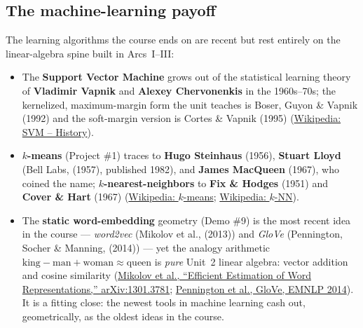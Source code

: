 \documentclass[11pt]{article}
\newcommand{\who}[1]{{\sffamily\bfseries #1}}
\newcommand{\yr}[1]{{\sffamily\color{BrickRed}(#1)}}
\begin{document}
\subsection{The machine-learning payoff}
The learning algorithms the course ends on are recent but rest entirely on the
linear-algebra spine built in Arcs~I--III:
\begin{itemize}[leftmargin=1.4em,itemsep=2pt]
  \item The \who{Support Vector Machine} grows out of the statistical learning
        theory of \who{Vladimir Vapnik} and \who{Alexey Chervonenkis} in the
        1960s--70s; the kernelized, maximum-margin form the unit teaches is Boser,
        Guyon \& Vapnik \yr{1992} and the soft-margin version is Cortes \& Vapnik
        \yr{1995} (\href{https://en.wikipedia.org/wiki/Support_vector_machine\#History}{Wikipedia:
        SVM -- History}).
  \item \who{$k$-means} (Project \#1) traces to \who{Hugo Steinhaus} \yr{1956},
        \who{Stuart Lloyd} (Bell Labs, \yr{1957}, published 1982), and \who{James
        MacQueen} \yr{1967}, who coined the name; \who{$k$-nearest-neighbors} to
        \who{Fix \& Hodges} \yr{1951} and \who{Cover \& Hart} \yr{1967}
        (\href{https://en.wikipedia.org/wiki/K-means_clustering\#History}{Wikipedia:
        $k$-means};
        \href{https://en.wikipedia.org/wiki/K-nearest_neighbors_algorithm}{Wikipedia:
        $k$-NN}).
  \item The \who{static word-embedding} geometry (Demo \#9) is the most recent
        idea in the course --- \emph{word2vec} (Mikolov et al., \yr{2013}) and
        \emph{GloVe} (Pennington, Socher \& Manning, \yr{2014}) --- yet the analogy
        arithmetic $\text{king}-\text{man}+\text{woman}\approx\text{queen}$ is
        \emph{pure} Unit~2 linear algebra: vector addition and cosine similarity
        (\href{https://arxiv.org/abs/1301.3781}{Mikolov et al., ``Efficient
        Estimation of Word Representations,'' arXiv:1301.3781};
        \href{https://nlp.stanford.edu/pubs/glove.pdf}{Pennington et al., GloVe,
        EMNLP 2014}). It is a fitting close: the newest tools in machine learning
        cash out, geometrically, as the oldest ideas in the course.
\end{itemize}

\end{document}
